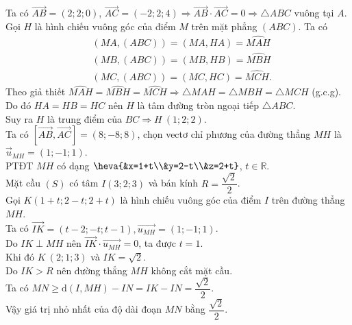 \begin{ex}
{\begin{center}
\end{center}	
Ta có $\overrightarrow{A B}=(2 ; 2 ; 0)$, $\overrightarrow{A C}=(-2 ; 2 ; 4) \Rightarrow \overrightarrow{A B} \cdot \overrightarrow{A C}=0 \Rightarrow \triangle ABC$ vuông tại $A$.\\
Gọi $H$ là hình chiếu vuông góc của điểm $M$ trên mặt phẳng $(A B C)$. Ta có
$$
\begin{aligned}
	& (MA, (ABC))=(MA, HA)=\widehat{MAH} \\
	& (MB, (ABC))=(MB, HB)=\widehat{MBH} \\
	& (MC, (ABC))=(MC, HC)=\widehat{MCH}.
\end{aligned}
$$
 Theo giả thiết $\widehat{MAH}=\widehat{MBH}=\widehat{MCH} \Rightarrow \triangle MAH=\triangle MBH=\triangle MCH$ (g.c.g).\\
Do đó $HA=HB=HC$ nên $H$ là tâm đường tròn ngoại tiếp $\triangle ABC$.\\
Suy ra $H$ là trung điểm của $BC\Rightarrow H\ (1; 2; 2)$.\\
Ta có $[\overrightarrow{AB}, \overrightarrow{AC}]=(8;-8; 8)$, chọn vectơ  chỉ phương của đường thẳng $MH$ là $\overrightarrow{u}_{MH}=(1;-1; 1)$. \\
PTĐT $MH$ có dạng $\heva{&x=1+t\\&y=2-t\\&z=2+t}$, $t\in \mathbb{R}$.\\
	Mặt cầu $(S)$ có tâm $I(3 ; 2 ; 3)$ và bán kính $R=\dfrac{\sqrt{2}}{2}$.\\
 Gọi $K(1+t; 2-t; 2+t)$ là hình chiếu vuông góc của điểm $I$ trên đường thẳng $MH$.\\
Ta có $\overrightarrow{IK}=(t-2;-t; t-1), \overrightarrow{u_{MH}}=(1;-1; 1)$.\\
Do $IK\perp MH$ nên $\overrightarrow{IK} \cdot \overrightarrow{u_{MH}}=0$, ta được $t=1$.\\
Khi đó $K\ (2; 1; 3)$ và $IK=\sqrt{2}$.\\
Do $IK > R$ nên đường thẳng $MH$ không cắt mặt cầu.\\
Ta có $MN\geq \mathrm{d}(I, MH)-IN=IK-IN=\dfrac{\sqrt{2}}{2}$.\\
Vậy giá trị nhỏ nhất của độ dài đoạn $M N$ bằng $\dfrac{\sqrt{2}}{2}$.
	}
\end{ex}